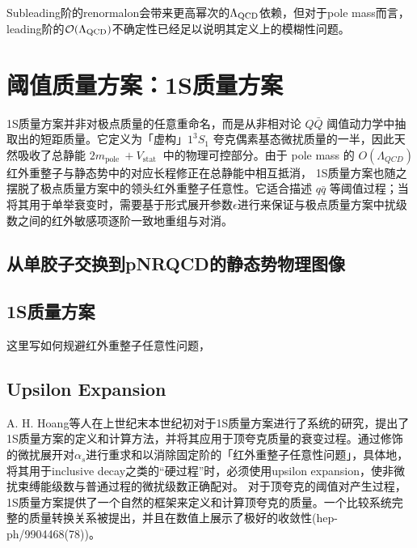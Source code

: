Subleading阶的renormalon会带来更高幂次的$\Lambda_{\rm QCD}$依赖，但对于pole mass而言，leading阶的$\mathcal{O}(\Lambda_{\rm QCD})$不确定性已经足以说明其定义上的模糊性问题\cite{Beneke:1998ui}。
\section{阈值质量方案：1S质量方案}
1S质量方案并非对极点质量的任意重命名，而是从非相对论 $Q \bar{Q}$ 阈值动力学中抽取出的短距质量。它定义为「虚构」$1^3 S_1$ 夸克偶素基态微扰质量的一半，因此天然吸收了总静能 $2 m_{\text {pole }}+V_{\text {stat }}$ 中的物理可控部分。由于 pole mass 的 $O\left(\Lambda_{Q C D}\right)$ 红外重整子与静态势中的对应长程修正在总静能中相互抵消， 1S质量方案也随之摆脱了极点质量方案中的领头红外重整子任意性。它适合描述 $q\bar{q}$ 等阈值过程；当将其用于单举衰变时，需要基于形式展开参数$\epsilon$进行来保证与极点质量方案中扰级数之间的红外敏感项逐阶一致地重组与对消。
\subsection{从单胶子交换到pNRQCD的静态势物理图像}


\subsection{1S质量方案}
    这里写如何规避红外重整子任意性问题，
\subsection{Upsilon Expansion}
A. H. Hoang等人在上世纪末本世纪初对于1S质量方案进行了系统的研究，提出了1S质量方案的定义和计算方法，并将其应用于顶夸克质量的衰变过程。通过修饰的微扰展开对$\alpha_s$进行重求和以消除固定阶的「红外重整子任意性问题」，具体地，将其用于inclusive decay之类的“硬过程”时，必须使用upsilon expansion，使非微扰束缚能级数与普通过程的微扰级数正确配对。
对于顶夸克的阈值对产生过程，1S质量方案提供了一个自然的框架来定义和计算顶夸克的质量。一个比较系统完整的质量转换关系被提出，并且在数值上展示了极好的收敛性(hep-ph/9904468(78))\cite{Hoang:1999zc}。

